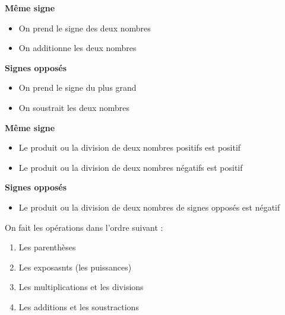 {\begin{minipage}{0.45\textwidth}
    \textbf{Même signe}
    \begin{itemize}
    \item On prend le signe des deux nombres
    \item On additionne les deux nombres
    \end{itemize}
\end{minipage}
\hfill
\begin{minipage}{0.45\textwidth}
    \textbf{Signes opposés}
    \begin{itemize}
    \item On prend le signe du plus grand
    \item On soustrait les deux nombres
    \end{itemize}    
\end{minipage}  }


{\textbf{Même signe}
\begin{itemize}
    \item Le produit ou la division de deux nombres positifs est positif
    \item Le produit ou la division de deux nombres négatifs est positif
\end{itemize}
\vspace{1em}
\textbf{Signes opposés}
\begin{itemize}
    \item Le produit ou la division de deux nombres de signes opposés est négatif
\end{itemize}
}


{On fait les opérations dans l'ordre suivant :
\begin{enumerate}
    \item Les parenthèses
    \item Les exposasnts (les puissances)
    \item Les multiplications et les divisions
    \item Les additions et les soustractions
\end{enumerate}}

